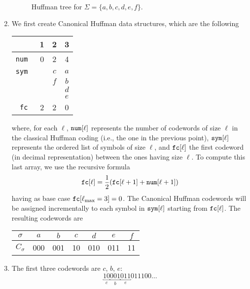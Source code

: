 \begin{enumerate}
\begin{figure}[t]
    \caption{Huffman tree for $\Sigma = \{ a, b, c, d, e, f \}$.}

    \label{fig:huffman-tree}
  \end{figure}

  \item We first create Canonical Huffman data structures, which are the
  following
  \begin{center}
    \begin{tabular}{r||c|c|c}
      \multicolumn{1}{r}{} & \multicolumn{1}{c}{\tiny 1} & \multicolumn{1}{c}{\tiny 2} & \multicolumn{1}{c}{\tiny 3} \\ \hline
      \tt num & 0 & 2 & 4 \\ \hline
      \tt sym &   & $c$ & $a$ \\
              & & $f$ & $b$ \\
              & & & $d$ \\
              & & & $e$ \\ \hline
      \tt fc  & 2 & 2 & 0 \\ \hline
    \end{tabular}
  \end{center}
  where, for each $\ell$, $\text{\tt num}[\ell]$ represents the number of
  codewords of size $\ell$ in the classical Huffman coding (i.e., the one in the
  previous point), $\text{\tt sym}[\ell]$ represents the ordered list of symbols
  of size $\ell$, and $\text{\tt fc}[\ell]$ the first codeword (in decimal
  representation) between the ones having size $\ell$. To compute this last
  array, we use the recursive formula $$\text{\tt fc}[\ell] =
  \frac{1}{2}(\text{\tt fc}[\ell + 1] + \text{\tt num}[\ell + 1])$$ having as
  base case $\text{\tt fc}[\ell_\text{max} = 3] = 0$. The Canonical Huffman
  codewords will be assigned incrementally to each symbol in $\text{\tt
  sym}[\ell]$ starting from $\text{\tt fc}[\ell]$. The resulting codewords are
  \begin{center}
    \begin{tabular}{c||c|c|c|c|c|c}
    $\sigma$ &  $a$ & $b$ & $c$ & $d$ & $e$ & $f$ \\\hline
    $C_\sigma$ &  000 & 001 & 10 & 010 & 011 & 11 \\
    \end{tabular}
  \end{center}

  \item The first three codewords are $c$, $b$, $e$:
  $$\underbracket{10}_c\underbracket{001}_b\underbracket{011}_e011100\dots$$

\end{enumerate}
